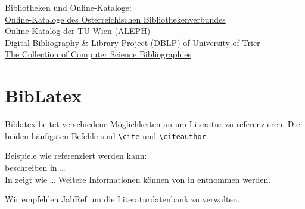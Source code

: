 Bibliotheken und Online-Kataloge:\\
\href{http://search.obvsg.at/primo_library/libweb/action/search.do?vid=ACC}{Online-Kataloge des Österreichischen Bibliothekenverbundes}\\
\href{http://aleph.ub.tuwien.ac.at/}{Online-Katalog der TU Wien} (ALEPH)\\
\href{http://www.informatik.uni-trier.de/}{Digital Bibliography \& Library Project (DBLP) of University of Trier}\\
\href{http://liinwww.ira.uka.de/bibliography/}{The Collection of Computer Science Bibliographies}

\section{BibLatex}

Biblatex beitet verschiedene Möglichkeiten an um Literatur zu referenzieren. Die beiden häufigsten Befehle sind \verb|\cite| und \verb|\citeauthor|.

Beispiele wie referenziert werden kann:\\
\citeauthor{fankhauser:2009:softwaretechnik-security} beschreiben in \cite{fankhauser:2009:softwaretechnik-security} \dots\\
In \cite{schanes:2011:voip-fuzzer} zeigt \citeauthor{schanes:2011:voip-fuzzer} wie \dots
Weitere Informationen können von \cite{oasis:2010:homepage} in \cite{oasis:2010:homepage} entnommen werden.

Wir empfehlen JabRef um die Literaturdatenbank zu verwalten.